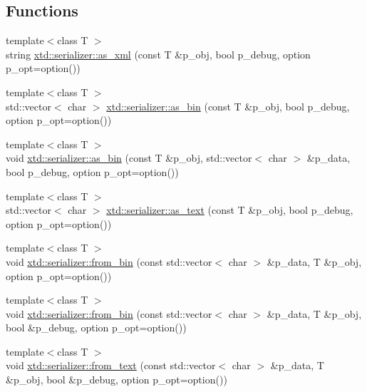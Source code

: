 \subsection*{Functions}
\begin{DoxyCompactItemize}
\item 
{\footnotesize template$<$class T $>$ }\\string \hyperlink{namespacextd_1_1serializer_aff0b24f230c8b5083104eccb94242a8c}{xtd\+::serializer\+::as\+\_\+xml} (const T \&p\+\_\+obj, bool p\+\_\+debug, option p\+\_\+opt=option())
\item 
{\footnotesize template$<$class T $>$ }\\std\+::vector$<$ char $>$ \hyperlink{namespacextd_1_1serializer_a0088e6d509f6652e58c7c0eea9102884}{xtd\+::serializer\+::as\+\_\+bin} (const T \&p\+\_\+obj, bool p\+\_\+debug, option p\+\_\+opt=option())
\item 
{\footnotesize template$<$class T $>$ }\\void \hyperlink{namespacextd_1_1serializer_a1c43eba643505bba5858d6d5431201fb}{xtd\+::serializer\+::as\+\_\+bin} (const T \&p\+\_\+obj, std\+::vector$<$ char $>$ \&p\+\_\+data, bool p\+\_\+debug, option p\+\_\+opt=option())
\item 
{\footnotesize template$<$class T $>$ }\\std\+::vector$<$ char $>$ \hyperlink{namespacextd_1_1serializer_a5ac463bb961b98f1b8b7c2655d2772db}{xtd\+::serializer\+::as\+\_\+text} (const T \&p\+\_\+obj, bool p\+\_\+debug, option p\+\_\+opt=option())
\item 
{\footnotesize template$<$class T $>$ }\\void \hyperlink{namespacextd_1_1serializer_a601beccda10ec2760c371d39045bec0e}{xtd\+::serializer\+::from\+\_\+bin} (const std\+::vector$<$ char $>$ \&p\+\_\+data, T \&p\+\_\+obj, option p\+\_\+opt=option())
\item 
{\footnotesize template$<$class T $>$ }\\void \hyperlink{namespacextd_1_1serializer_a76ec6ed068121fc7ff0f6514132c5683}{xtd\+::serializer\+::from\+\_\+bin} (const std\+::vector$<$ char $>$ \&p\+\_\+data, T \&p\+\_\+obj, bool \&p\+\_\+debug, option p\+\_\+opt=option())
\item 
{\footnotesize template$<$class T $>$ }\\void \hyperlink{namespacextd_1_1serializer_a27ea640a20bff130274562ddd8762c0a}{xtd\+::serializer\+::from\+\_\+text} (const std\+::vector$<$ char $>$ \&p\+\_\+data, T \&p\+\_\+obj, bool \&p\+\_\+debug, option p\+\_\+opt=option())
\end{DoxyCompactItemize}


